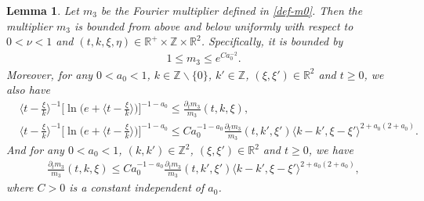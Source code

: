 \documentclass[11pt,reqno]{article}
\newtheorem{lemm}[theo]{Lemma}
\numberwithin{equation}{section}
\newcommand\R{{\mathbb R}}
\newcommand\Z{{\mathbb Z}}
\let\pa=\partial
\let\f=\frac
\begin{document}
\begin{lemm}\label{sec2:lem-0-0}
Let $m_{3}$ be the Fourier multiplier defined in \eqref{def-m0}. Then the multiplier $m_3$ is bounded from above and below uniformly with respect to $0<\nu<1$ and $(t,k,\xi,\eta)\in\R^+\times \Z\times\R^2$. 
Specifically, it is bounded by
\begin{align}\label{est-m0-0}
	1\leq m_3\leq e^{C a_0^{-2}}.
\end{align}
Moreover, for any $0<a_0<1$, $k\in \Z\backslash\{0\}$, $k'\in\Z$, $(\xi,\xi')\in\R^2$ and $t\geq0$, we also have 
\begin{align}
	&\big\langle t-\f{\xi}{k}\big\rangle^{-1}\big[\ln\big(e+\big\langle t-\f{\xi}{k}\big\rangle\big)\big]^{-1-a_0}
	\leq \f{\pa_tm_3}{m_3}(t,k,\xi),
	\label{est-m0-1}
	\\
	&\big\langle t-\f{\xi}{k}\big\rangle^{-1}\big[\ln\big(e+\big\langle t-\f{\xi}{k}\big\rangle\big)\big]^{-1-a_0}
	\leq Ca_0^{-1-a_0}\f{\pa_tm_3}{m_3}(t,k',\xi')\langle k-k',\xi-\xi'\rangle^{2+a_0(2+a_0)}.
	\label{est-m0-2}
\end{align}
And for any $0<a_0<1$, $(k,k')\in \Z^2$, $(\xi,\xi')\in\R^2$ and $t\geq0$, we have
\begin{align}
	\f{\pa_tm_3}{m_3}(t,k,\xi)\leq Ca_0^{-1-a_0}  \f{\pa_tm_3}{m_3}(t,k',\xi')\langle k-k',\xi-\xi'\rangle^{2+a_0(2+a_0)},
	\label{est-m0-3}
\end{align}
where $C>0$ is a constant independent of $a_0$. 
\end{lemm}
\end{document}
